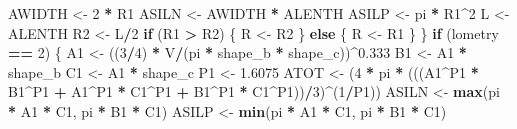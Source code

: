 \documentclass[]{article}
\newenvironment{Shaded}{\begin{snugshade}}{\end{snugshade}}
\newcommand{\KeywordTok}[1]{\textcolor[rgb]{0.13,0.29,0.53}{\textbf{#1}}}
\newcommand{\DecValTok}[1]{\textcolor[rgb]{0.00,0.00,0.81}{#1}}
\newcommand{\FloatTok}[1]{\textcolor[rgb]{0.00,0.00,0.81}{#1}}
\newcommand{\StringTok}[1]{\textcolor[rgb]{0.31,0.60,0.02}{#1}}
\newcommand{\ControlFlowTok}[1]{\textcolor[rgb]{0.13,0.29,0.53}{\textbf{#1}}}
\newcommand{\OperatorTok}[1]{\textcolor[rgb]{0.81,0.36,0.00}{\textbf{#1}}}
\newcommand{\NormalTok}[1]{#1}
\begin{document}
\begin{Shaded}
\begin{Highlighting}[]
\NormalTok{        AWIDTH <-}\StringTok{ }\DecValTok{2} \OperatorTok{*}\StringTok{ }\NormalTok{R1}
\NormalTok{        ASILN <-}\StringTok{ }\NormalTok{AWIDTH }\OperatorTok{*}\StringTok{ }\NormalTok{ALENTH}
\NormalTok{        ASILP <-}\StringTok{ }\NormalTok{pi }\OperatorTok{*}\StringTok{ }\NormalTok{R1}\OperatorTok{^}\DecValTok{2}
\NormalTok{        L <-}\StringTok{ }\NormalTok{ALENTH}
\NormalTok{        R2 <-}\StringTok{ }\NormalTok{L}\OperatorTok{/}\DecValTok{2}
        \ControlFlowTok{if}\NormalTok{ (R1 }\OperatorTok{>}\StringTok{ }\NormalTok{R2) \{}
\NormalTok{            R <-}\StringTok{ }\NormalTok{R2}
\NormalTok{        \}}
        \ControlFlowTok{else}\NormalTok{ \{}
\NormalTok{            R <-}\StringTok{ }\NormalTok{R1}
\NormalTok{        \}}
\NormalTok{    \}}
    \ControlFlowTok{if}\NormalTok{ (lometry }\OperatorTok{==}\StringTok{ }\DecValTok{2}\NormalTok{) \{}
\NormalTok{        A1 <-}\StringTok{ }\NormalTok{((}\DecValTok{3}\OperatorTok{/}\DecValTok{4}\NormalTok{) }\OperatorTok{*}\StringTok{ }\NormalTok{V}\OperatorTok{/}\NormalTok{(pi }\OperatorTok{*}\StringTok{ }\NormalTok{shape_b }\OperatorTok{*}\StringTok{ }\NormalTok{shape_c))}\OperatorTok{^}\FloatTok{0.333}
\NormalTok{        B1 <-}\StringTok{ }\NormalTok{A1 }\OperatorTok{*}\StringTok{ }\NormalTok{shape_b}
\NormalTok{        C1 <-}\StringTok{ }\NormalTok{A1 }\OperatorTok{*}\StringTok{ }\NormalTok{shape_c}
\NormalTok{        P1 <-}\StringTok{ }\FloatTok{1.6075}
\NormalTok{        ATOT <-}\StringTok{ }\NormalTok{(}\DecValTok{4} \OperatorTok{*}\StringTok{ }\NormalTok{pi }\OperatorTok{*}\StringTok{ }\NormalTok{(((A1}\OperatorTok{^}\NormalTok{P1 }\OperatorTok{*}\StringTok{ }\NormalTok{B1}\OperatorTok{^}\NormalTok{P1 }\OperatorTok{+}\StringTok{ }\NormalTok{A1}\OperatorTok{^}\NormalTok{P1 }\OperatorTok{*}\StringTok{ }\NormalTok{C1}\OperatorTok{^}\NormalTok{P1 }\OperatorTok{+}\StringTok{ }
\StringTok{            }\NormalTok{B1}\OperatorTok{^}\NormalTok{P1 }\OperatorTok{*}\StringTok{ }\NormalTok{C1}\OperatorTok{^}\NormalTok{P1))}\OperatorTok{/}\DecValTok{3}\NormalTok{)}\OperatorTok{^}\NormalTok{(}\DecValTok{1}\OperatorTok{/}\NormalTok{P1))}
\NormalTok{        ASILN <-}\StringTok{ }\KeywordTok{max}\NormalTok{(pi }\OperatorTok{*}\StringTok{ }\NormalTok{A1 }\OperatorTok{*}\StringTok{ }\NormalTok{C1, pi }\OperatorTok{*}\StringTok{ }\NormalTok{B1 }\OperatorTok{*}\StringTok{ }\NormalTok{C1)}
\NormalTok{        ASILP <-}\StringTok{ }\KeywordTok{min}\NormalTok{(pi }\OperatorTok{*}\StringTok{ }\NormalTok{A1 }\OperatorTok{*}\StringTok{ }\NormalTok{C1, pi }\OperatorTok{*}\StringTok{ }\NormalTok{B1 }\OperatorTok{*}\StringTok{ }\NormalTok{C1)}

\end{Highlighting}
\end{Shaded}
\end{document}
